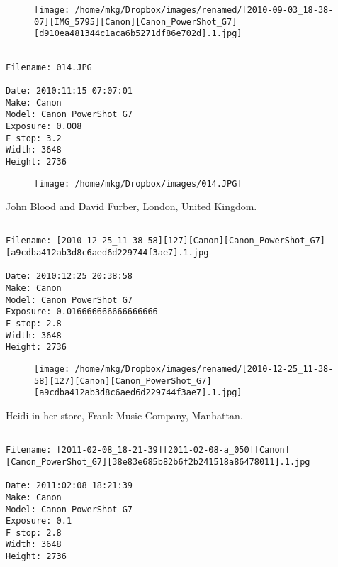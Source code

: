 \begin{figure}
\texttt{[image: /home/mkg/Dropbox/images/renamed/[2010-09-03\_18-38-07][IMG\_5795][Canon][Canon\_PowerShot\_G7][d910ea481344c1aca6b5271df86e702d].1.jpg]}
\end{figure}
    
\clearpage
\onecolumn
\noindent 
\noindent
\begin{lstlisting}

Filename: 014.JPG

Date: 2010:11:15 07:07:01
Make: Canon
Model: Canon PowerShot G7
Exposure: 0.008
F stop: 3.2
Width: 3648
Height: 2736
\end{lstlisting}
\clearpage

\begin{figure}
\texttt{[image: /home/mkg/Dropbox/images/014.JPG]}
\end{figure}
    
\clearpage
\onecolumn
\noindent John Blood and David Furber, London, United Kingdom.
\noindent
\begin{lstlisting}

Filename: [2010-12-25_11-38-58][127][Canon][Canon_PowerShot_G7][a9cdba412ab3d8c6aed6d229744f3ae7].1.jpg

Date: 2010:12:25 20:38:58
Make: Canon
Model: Canon PowerShot G7
Exposure: 0.016666666666666666
F stop: 2.8
Width: 3648
Height: 2736
\end{lstlisting}
\clearpage

\begin{figure}
\texttt{[image: /home/mkg/Dropbox/images/renamed/[2010-12-25\_11-38-58][127][Canon][Canon\_PowerShot\_G7][a9cdba412ab3d8c6aed6d229744f3ae7].1.jpg]}
\end{figure}
    
\clearpage
\onecolumn
\noindent Heidi in her store, Frank Music Company, Manhattan.
\noindent
\begin{lstlisting}

Filename: [2011-02-08_18-21-39][2011-02-08-a_050][Canon][Canon_PowerShot_G7][38e83e685b82b6f2b241518a86478011].1.jpg

Date: 2011:02:08 18:21:39
Make: Canon
Model: Canon PowerShot G7
Exposure: 0.1
F stop: 2.8
Width: 3648
Height: 2736
\end{lstlisting}
\clearpage

